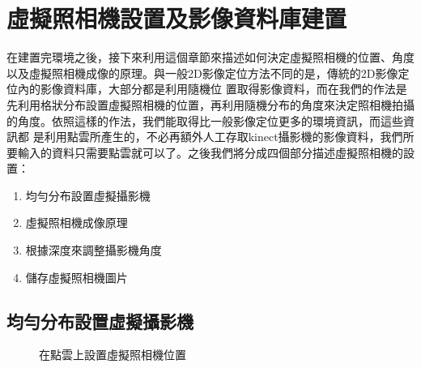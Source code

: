 \section{虛擬照相機設置及影像資料庫建置}
	
	在建置完環境之後，接下來利用這個章節來描述如何決定虛擬照相機的位置、角度以及虛擬照相機成像的原理。與一般2D影像定位方法不同的是，傳統的2D影像定位內的影像資料庫，大部分都是利用隨機位
	置取得影像資料，而在我們的作法是先利用格狀分布設置虛擬照相機的位置，再利用隨機分布的角度來決定照相機拍攝的角度。依照這樣的作法，我們能取得比一般影像定位更多的環境資訊，而這些資訊都
	是利用點雲所產生的，不必再額外人工存取kinect攝影機的影像資料，我們所要輸入的資料只需要點雲就可以了。之後我們將分成四個部分描述虛擬照相機的設置：
	
	\begin{enumerate}
		\item 均勻分布設置虛擬攝影機
    	\item 虛擬照相機成像原理
    	\item 根據深度來調整攝影機角度
    	\item 儲存虛擬照相機圖片
	\end{enumerate}		

\subsection{均勻分布設置虛擬攝影機}
%

	\begin{figure}
		\begin{center}
		\end{center}
	  \caption{在點雲上設置虛擬照相機位置}
	  \label{fig:Virtual Camera Pose}	
	\end{figure}	
	

